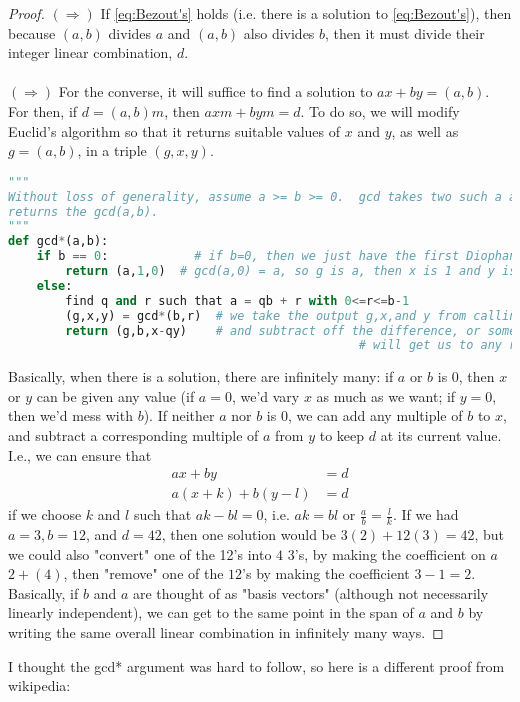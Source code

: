 \documentclass[10pt]{article}
\theoremstyle{definition}
\begin{document}
\begin{proof}
\textbf{$(\Rightarrow)$} If \ref{eq:Bezout's} holds (i.e. there is a solution to \ref{eq:Bezout's}), then because $(a,b)$ divides $a$ and $(a,b)$ also divides $b$, then it must divide their integer linear combination, $d$.  \\~\\
\textbf{$(\Rightarrow)$} For the converse, it will suffice to find a solution to $ax+by=(a,b)$.  For then, if $d=(a,b)m$, then $axm+bym=d$.  To do so, we will modify Euclid's algorithm so that it returns suitable values of $x$ and $y$, as well as $g=(a,b)$, in a triple $(g,x,y)$.  
\begin{lstlisting}[language=Python]
""" 
Without loss of generality, assume a >= b >= 0.  gcd takes two such a and b, and 
returns the gcd(a,b). 
"""
def gcd*(a,b): 
	if b == 0:			  # if b=0, then we just have the first Diophantine equation, so 
		return (a,1,0)  # gcd(a,0) = a, so g is a, then x is 1 and y is 0
	else: 				    
		find q and r such that a = qb + r with 0<=r<=b-1 
		(g,x,y) = gcd*(b,r)  # we take the output g,x,and y from calling gcd* on b and r
		return (g,b,x-qy)    # and subtract off the difference, or something.  I think this 
							 					 # will get us to any returned number mod g is 0??
\end{lstlisting}
Basically, when there is a solution, there are infinitely many: if $a$ or $b$ is 0, then $x$ or $y$ can be given any value (if $a=0$, we'd vary $x$ as much as we want; if $y=0$, then we'd mess with $b$).  If neither $a$ nor $b$ is 0, we can add any multiple of $b$ to $x$, and subtract a corresponding multiple of $a$ from $y$ to keep $d$ at its current value.  I.e., we can ensure that
\begin{align*}
ax + by &= d \\ 
a(x+k) + b(y-l) &= d
\end{align*}
if we choose $k$ and $l$ such that $ak -bl = 0$, i.e. $ak = bl$ or $\frac{a}{b}=\frac{l}{k}$.  If we had $a=3,b=12$, and $d=42$, then one solution would be $3(2) + 12(3) = 42$, but we could also "convert" one of the 12's into $4$ 3's, by making the coefficient on $a$ $2+(4)$, then "remove" one of the $12$'s by making the coefficient $3-1=2$.  Basically, if $b$ and $a$ are thought of as "basis vectors" (although not necessarily linearly independent), we can get to the same point in the span of $a$ and $b$ by writing the same overall linear combination in infinitely many ways.  
\end{proof}
\noindent I thought the gcd* argument was hard to follow, so here is a different proof from wikipedia: 
\end{document}
